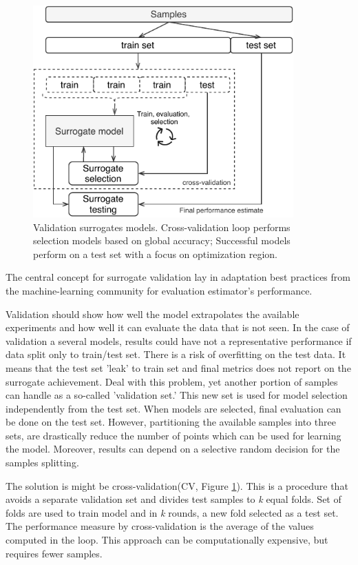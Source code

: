             \begin{figure}
                \centering
                \includegraphics[width=10cm]{content/images/cv}
                \caption[Cross-validation: exploration vs exploitation]{Validation surrogates models. Cross-validation loop performs selection models based on global accuracy; Successful models perform on a test set with a focus on optimization region.} 
                \label{fig:cv}   
            \end{figure}

        The central concept for surrogate validation lay in adaptation best practices from the machine-learning community for evaluation estimator's performance. 

        Validation should show how well the model extrapolates the available experiments and how well it can evaluate the data that is not seen. In the case of validation a several models, results could have not a representative performance if data split only to train/test set.  There is a risk of overfitting on the test data. It means that the test set 'leak' to train set and final metrics does not report on the surrogate achievement. 
        Deal with this problem, yet another portion of samples can handle as a so-called 'validation set.' This new set is used for model selection independently from the test set. When models are selected, final evaluation can be done on the test set. However, partitioning the available samples into three sets, are drastically reduce the number of points which can be used for learning the model. Moreover, results can depend on a selective random decision for the samples splitting.
        
        The solution is might be cross-validation(CV, Figure \ref{fig:cv}). This is a procedure that avoids a separate validation set and divides test samples to \textit{k} equal folds. Set of folds are used to train model and in \textit{k} rounds, a new fold selected as a test set. The performance measure by cross-validation is the average of the values computed in the loop. This approach can be computationally expensive, but requires fewer samples. 
        
